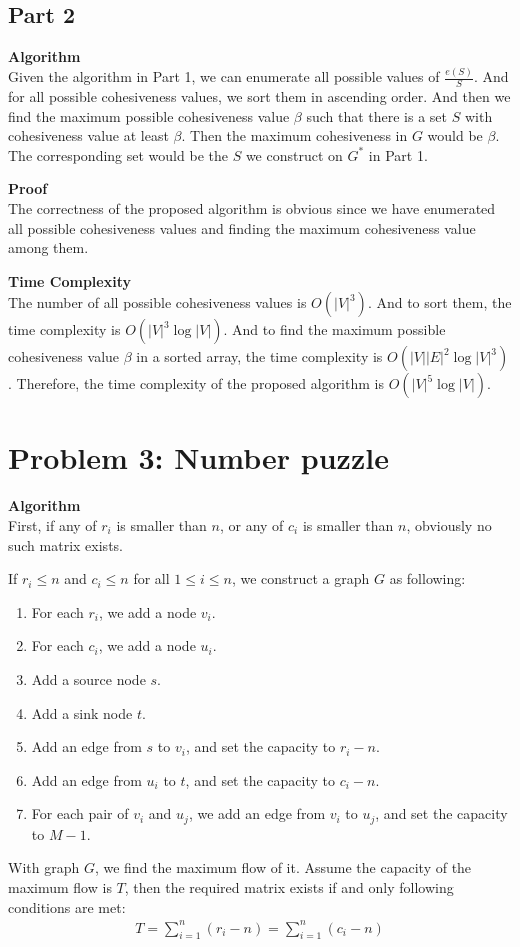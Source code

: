 \documentclass{article}
\newcommand{\Complexity}{\vspace{0.3cm} \noindent\textbf{Time Complexity} \\}
\newcommand{\Proof}{\vspace{0.3cm} \noindent\textbf{Proof} \\}
\newcommand{\Algorithm}{\textbf{Algorithm} \\}
\begin{document}
\subsection*{Part 2}
\Algorithm
Given the algorithm in Part 1, we can enumerate all possible values of $\frac{e(S)}{S}$. And for
all possible cohesiveness values, we sort them in ascending order. And then we find the maximum
possible cohesiveness value $\beta$ such that there is a set $S$ with cohesiveness value at least 
$\beta$. Then the maximum cohesiveness in $G$ would be $\beta$. The corresponding set would be the
$S$ we construct on $G^*$ in Part 1.   

\Proof
The correctness of the proposed algorithm is obvious since we have enumerated all possible
cohesiveness values
and finding the maximum cohesiveness value among them.

\Complexity
The number of all possible cohesiveness values is $O(|V|^3)$. And to sort them, the time complexity
is $O(|V|^3 \log |V|)$. And to find the maximum possible cohesiveness value $\beta$ in a sorted array, the
time complexity is $O(|V||E|^2 \log |V|^3 )$. Therefore, the time complexity of the proposed
algorithm is $O(|V|^5 \log |V|)$.

\section*{Problem 3: Number puzzle}
\Algorithm
First, if any of $r_i$  is smaller than $n$, or any of $c_i$ is smaller than $n$, obviously no such
matrix exists.

If $r_i \leq n$ and $c_i \leq n$ for all $1 \leq i \leq n$, we construct a graph $G$ as following:
\begin{enumerate}
  \item For each $r_i$, we add a node $v_i$.
  \item For each $c_i$, we add a node $u_i$.
  \item Add a source node $s$.
  \item Add a sink node $t$.
  \item Add an edge from $s$ to $v_i$, and set the capacity to $r_i - n$.
  \item Add an edge from $u_i$ to $t$, and set the capacity to $c_i - n$.
  \item For each pair of $v_i$ and $u_j$, we add an edge from $v_i$ to $u_j$, and set the capacity to
    $M-1$. 
\end{enumerate}

With graph $G$, we find the maximum flow of it. Assume the capacity of the maximum flow is $T$, then
the required matrix exists if and only following conditions are met:
\begin{align}
  T = \sum_{i=1}^{n} (r_i - n) = \sum_{i=1}^{n}(c_i - n)
\end{align}
\end{document}
